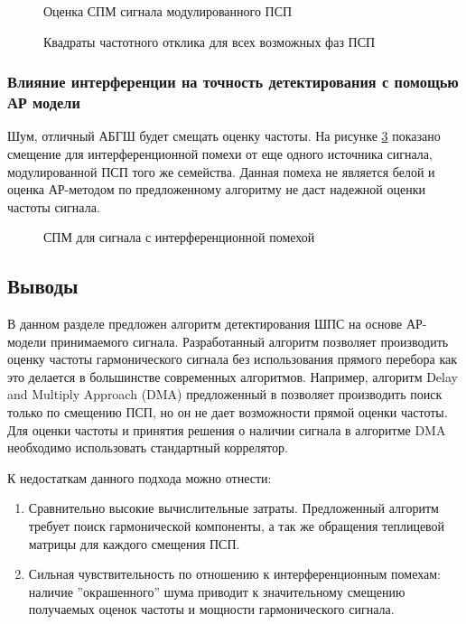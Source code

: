 \begin{figure}[H]
	\center{}
	\caption{Оценка СПМ сигнала модулированного ПСП}
	\label{pic:lpc_psd_1}
\end{figure}
\begin{figure}[H]
	\center{}
	\caption{Квадраты частотного отклика для всех возможных фаз ПСП}
	\label{pic:lpc_1sat_energy}
\end{figure}



\subsubsection{Влияние интерференции на точность детектирования с помощью АР модели}
Шум, отличный АБГШ будет смещать оценку частоты. На рисунке \ref{pic:lpc_2sat_psd} показано
смещение для интерференционной помехи от еще одного источника сигнала, модулированной ПСП того же семейства.
Данная помеха не является белой и оценка АР-методом по предложенному алгоритму не даст надежной оценки частоты сигнала.

\begin{figure}[H]
	\center{}
	\caption{СПМ для сигнала с интерференционной помехой}
	\label{pic:lpc_2sat_psd}
\end{figure}

\subsection*{Выводы}
\label{ssec:sec3_lpc_conclusion}

В данном разделе предложен алгоритм детектирования ШПС на основе АР-модели принимаемого сигнала.
Разработанный алгоритм позволяет производить оценку частоты гармонического сигнала без использования прямого
перебора как это делается в большинстве современных алгоритмов. Например, алгоритм Delay and Multiply Approach (DMA) предложенный в 
\cite{lin_dma, tsui} позволяет производить поиск только по смещению ПСП, но он не дает возможности прямой оценки частоты.
Для оценки частоты и принятия решения о наличии сигнала в алгоритме DMA необходимо использовать стандартный коррелятор.

К недостаткам данного подхода можно отнести: 
\begin{enumerate}
	\item Сравнительно высокие вычислительные затраты. Предложенный алгоритм требует поиск гармонической
		компоненты, а так же обращения теплицевой матрицы для каждого смещения ПСП.
	\item Сильная чувствительность по отношению к интерференционным помехам: наличие
		''окрашенного'' шума приводит к значительному смещению получаемых
		оценок частоты и мощности гармонического сигнала.
\end{enumerate}
